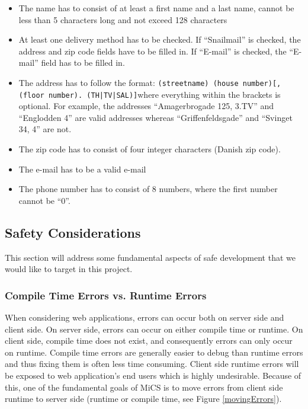		\begin{itemize}
			\item The name has to consist of at least a first name and a last name, cannot be less than 5 characters long and not exceed 128 characters
			\item At least one delivery method has to be checked. If “Snailmail” is checked, the address and zip code fields have to be filled in. If “E-mail” is checked, the “E-mail” field has to be filled in.
			\item The address has to follow the format: \newline\newline \texttt{(streetname) (house number)[, (floor number). (TH|TV|SAL)]}\newline\newline where everything within the brackets is optional. For example, the addresses ``Amagerbrogade 125, 3.TV'' and ``Englodden 4'' are valid addresses whereas ``Griffenfeldsgade'' and ``Svinget 34, 4'' are not.
			\item The zip code has to consist of four integer characters (Danish zip code).
			\item The e-mail has to be a valid e-mail
			\item The phone number has to consist of 8 numbers, where the first number cannot be “0”.
		\end{itemize}


	\subsection{Safety Considerations} %
	\label{sub:safety_considerations}
		This section will address some fundamental aspects of safe development that we would like to target in this project.

		\subsubsection{Compile Time Errors vs. Runtime Errors} %
		\label{ssub:compile_time_errors_vs_runtime_errors}
			
			When considering web applications, errors can occur both on server side and client side. On server side, errors can occur on either compile time or runtime. On client side, compile time does not exist, and consequently errors can only occur on runtime.
			Compile time errors are generally easier to debug than runtime errors and thus fixing them is often less time consuming. Client side runtime errors will be exposed to web application's end users which is highly undesirable. Because of this, one of the fundamental goals of MiCS is to move errors from client side runtime to server side (runtime or compile time, see Figure \ref{movingErrors}).

